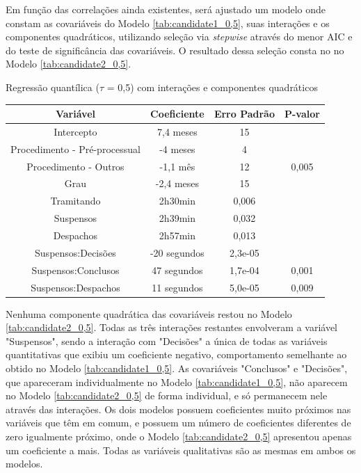 Em função das correlações ainda existentes, será ajustado um modelo onde constam as covariáveis do Modelo \ref{tab:candidate1_0,5}, suas interações e os componentes quadráticos, utilizando seleção via \textit{stepwise} através do menor AIC e do teste de significância das covariáveis. O resultado dessa seleção consta no no Modelo \ref{tab:candidate2_0,5}.

\begin{modelo}[H]
\centering
\caption{Regressão quantílica ($\tau$ = 0,5) com interações e componentes quadráticos} 
\label{tab:candidate2_0,5}
\begin{tabular}{c|cc|c}
  \hline
\textbf{Variável} & \textbf{Coeficiente} & \textbf{Erro Padrão} & \textbf{P-valor} \\ 
  \hline
  Intercepto & 7,4 meses & 15 & \approx 0 \\ 
  Procedimento - Pré-processual & -4 meses & 4 & \approx 0 \\  
  Procedimento - Outros & -1,1 mês & 12 & 0,005 \\
  Grau & -2,4 meses & 15 & \approx 0 \\ 
  Tramitando & 2h30min & 0,006 & \approx 0 \\ 
  Suspensos & 2h39min & 0,032 & \approx 0 \\ 
  Despachos & 2h57min & 0,013 & \approx 0 \\ 
  Suspensos:Decisões & -20 segundos & 2,3e-05 & \approx 0 \\ 
  Suspensos:Conclusos & 47 segundos & 1,7e-04 & 0,001 \\ 
  Suspensos:Despachos & 11 segundos & 5,0e-05 & 0,009 \\
   \hline
\end{tabular}
\end{modelo}

Nenhuma componente quadrática das covariáveis restou no Modelo \ref{tab:candidate2_0,5}. Todas as três interações restantes envolveram a variável "Suspensos", sendo a interação com "Decisões" a única de todas as variáveis quantitativas que exibiu um coeficiente negativo, comportamento semelhante ao obtido no Modelo \ref{tab:candidate1_0,5}. As covariáveis "Conclusos" e "Decisões", que apareceram individualmente no Modelo \ref{tab:candidate1_0,5}, não aparecem no Modelo \ref{tab:candidate2_0,5} de forma individual, e só permanecem nele através das interações. Os dois modelos possuem coeficientes muito próximos nas variáveis que têm em comum, e possuem um número de coeficientes diferentes de zero igualmente próximo, onde o Modelo \ref{tab:candidate2_0,5} apresentou apenas um coeficiente a mais. Todas as variáveis qualitativas são as mesmas em ambos os modelos.

